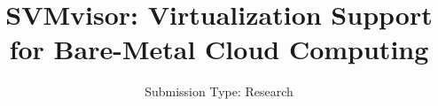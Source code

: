 \documentclass[10pt,twocolumn]{article}
\begin{document}
\title{SVMvisor: Virtualization Support for Bare-Metal Cloud Computing}
\author{
\small Submission Type: Research
}
\date{}
\maketitle












\end{document}
